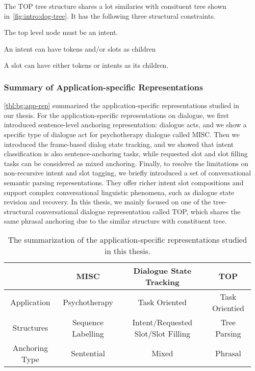 The TOP tree structure shares a lot similaries with consituent tree
shown in~\autoref{fig:intro:dog-tree}. It has the following three structural
constraints.
\begin{inparaenum}[(1)]
\item The top level node must be an intent.
\item An intent can have tokens and/or slots as children
\item A slot can have either tokens or intents as its children.
\end{inparaenum}

\subsubsection{Summary of Application-specific Representations}
\label{ssec:bg:summary-application-rep}
\autoref{tbl:bg:app-rep} summarized the application-specific
representations studied in our thesis. For the application-specific
representations on dialogue, we first introduced sentence-level
anchoring representation: dialogue acts, and we show a specific type
of dialogue act for psychotherapy dialogue called MISC. Then we
introduced the frame-based dialog state tracking, and we showed that
intent classification is also sentence-anchoring tasks, while
requested slot and slot filling tasks can be considered as mixed
anchoring. Finally, to resolve the limitations on non-recursive intent
and slot tagging, we briefly introduced a set of conversational
semantic parsing representations. They offer richer intent slot
compositions and support complex conversational linguistic phenomena,
such as dialogue state revision and recovery.  In this thesis, we
mainly focused on one of the tree-structural conversational dialogue
representation called TOP, which shares the same phrasal anchoring due
to the similar structure with constituent tree.

\begin{table}[ht]
  \begin{center}
\setlength{\tabcolsep}{4pt}
{\small
\begin{tabular}{c|c|c|c}
  \toprule
  \hline
  & {\bf MISC}               & {\bf Dialogue State Tracking}            & {\bf TOP}            \\ \hline
  Application    & Psychotherapy      & Task Oriented                      & Task Orientied \\
  Structures     & Sequence Labelling & Intent/Requested Slot/Slot Filling & Tree Parsing   \\
  Anchoring Type & Sentential         & Mixed                              & Phrasal        \\
  \hline
  \bottomrule

\end{tabular}}
\end{center}
\caption{The summarization of the application-specific representations studied in this thesis.}
\label{tbl:bg:app-rep}
\end{table}



